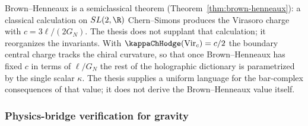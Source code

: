 \begin{remark}
\label{rem:brown-henneaux-thesis}
Brown--Henneaux is a semiclassical theorem
(Theorem~\ref{thm:brown-henneaux}): a classical calculation
on $SL(2,\R)$ Chern--Simons produces the Virasoro charge with
$c = 3\ell/(2G_N)$. The thesis does not supplant that
calculation; it reorganizes the invariants. With
$\kappaChHodge(\mathrm{Vir}_c) = c/2$ the boundary central charge
tracks the chiral curvature, so that once Brown--Henneaux
has fixed $c$ in terms of $\ell/G_N$ the rest of the
holographic dictionary is parametrized by the single scalar
$\kappa$. The thesis supplies a uniform language for the
bar-complex consequences of that value; it does not derive
the Brown--Henneaux value itself.
\end{remark}

\subsubsection*{Physics-bridge verification for gravity}

